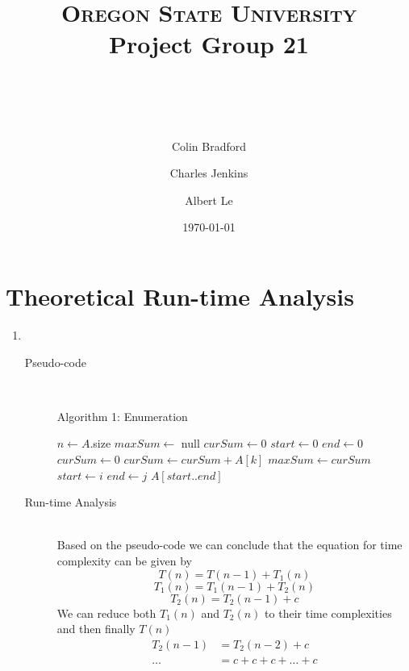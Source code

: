 \documentclass[paper=a4, fontsize=11pt]{scrartcl} %
\title{ 
    \normalfont \normalsize 
    \textsc{Oregon State University} \\ [25pt]
    \large Project Group 21
    \horrule{0.5pt} \\[0.4cm] %
    \huge \hwtitle \\ %
    \horrule{2pt} \\[0.5cm] %
}
\author{
    Colin Bradford
    \and
    Charles Jenkins
    \and
    Albert Le
} %
\date{\normalsize\today} %
\numberwithin{equation}{section} %
\numberwithin{figure}{section} %
\numberwithin{table}{section} %
\begin{document}
\maketitle %


\section{Theoretical Run-time Analysis}
\begin{enumerate}[label=\bfseries Algorithm \arabic*:]
    \item \hfill \\
    \begin{description}
        \item[Pseudo-code] \hfill \\
        \begin{algorithmc}
            \caption{Algorithm 1: Enumeration}
                \State $n \gets A$.size
                \State $maxSum \gets$ null
                \State $curSum \gets 0$
                \State $start \gets 0$
                \State $end \gets 0$
                        \State $curSum \gets 0$
                            \State $curSum \gets curSum + A[k]$
                        \EndFor
                            \State $maxSum \gets curSum$
                            \State $start \gets i$
                            \State $end \gets j$
                        \EndIf
                    \EndFor
                \EndFor
                \State \Return $A[start..end]$
            \EndFunction
        \end{algorithmc}
        \item[Run-time Analysis] \hfill \\
        Based on the pseudo-code we can conclude that the equation for 
        time complexity can be given by
        \[ T(n) = T(n - 1) + T_1(n) \]
        \[ T_1(n) = T_1(n - 1) + T_2(n) \]
        \[ T_2(n) = T_2(n - 1) + c \]
        We can reduce both $T_1(n)$ and $T_2(n)$ to their time complexities
        and then finally $T(n)$
        \begin{align*}
            T_2(n - 1) & = T_2(n - 2) + c \\
            \ldots & = c + c + c + \ldots + c \\

\end{align*}
\end{description}
\end{enumerate}
\end{document}
